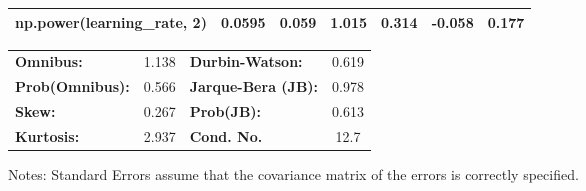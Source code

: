 \begin{center}
\begin{tabular}{lcccccc}
\textbf{np.power(learning\_rate, 2)}      &       0.0595  &        0.059     &     1.015  &         0.314        &       -0.058    &        0.177     \\
\bottomrule
\end{tabular}
\begin{tabular}{lclc}
\textbf{Omnibus:}       &  1.138 & \textbf{  Durbin-Watson:     } &    0.619  \\
\textbf{Prob(Omnibus):} &  0.566 & \textbf{  Jarque-Bera (JB):  } &    0.978  \\
\textbf{Skew:}          &  0.267 & \textbf{  Prob(JB):          } &    0.613  \\
\textbf{Kurtosis:}      &  2.937 & \textbf{  Cond. No.          } &     12.7  \\
\bottomrule
\end{tabular}
\end{center}

Notes: \newline
 [1] Standard Errors assume that the covariance matrix of the errors is correctly specified.